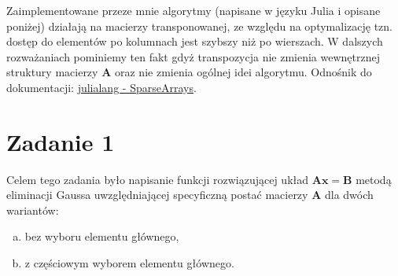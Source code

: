 \documentclass[]{article}
\newcommand{\mA}{\bm{A}}
\newcommand{\mB}{\bm{B}}
\newcommand{\vx}{\bm{x}}
\begin{document}
	\noindent Zaimplementowane przeze mnie algorytmy (napisane w języku Julia i opisane poniżej) działają na macierzy transponowanej, ze względu na optymalizację tzn. dostęp do elementów po kolumnach jest szybszy niż po wierszach. W dalszych rozważaniach pominiemy ten fakt gdyż transpozycja nie zmienia wewnętrznej struktury macierzy $\mA$ oraz nie zmienia ogólnej idei algorytmu.
	Odnośnik do dokumentacji: 
	\href{https://docs.julialang.org/en/v1/stdlib/SparseArrays/}{julialang - SparseArrays}.
	\section*{Zadanie 1}
	
	Celem tego zadania było napisanie funkcji rozwiązującej układ $\mA\vx = \mB$ metodą eliminacji Gaussa uwzględniającej specyficzną postać macierzy $\mA$ dla dwóch wariantów:
	\begin{enumerate}[a)]
		\item bez wyboru elementu głównego,
		\item z częściowym wyborem elementu głównego.
	\end{enumerate}
\end{document}
